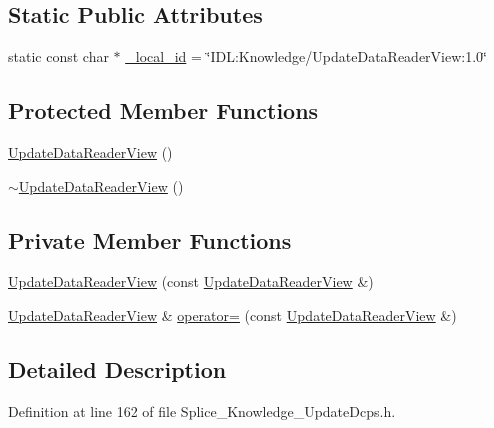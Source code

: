 \subsection*{Static Public Attributes}
\begin{DoxyCompactItemize}
\item 
static const char $\ast$ \hyperlink{classKnowledge_1_1UpdateDataReaderView_a245b395880e8012c3522f482ce57714d}{\_\-local\_\-id} = \char`\"{}IDL:Knowledge/UpdateDataReaderView:1.0\char`\"{}
\end{DoxyCompactItemize}
\subsection*{Protected Member Functions}
\begin{DoxyCompactItemize}
\item 
\hyperlink{classKnowledge_1_1UpdateDataReaderView_afb389ef63212060339e8983c4e6eeead}{UpdateDataReaderView} ()
\item 
\hyperlink{classKnowledge_1_1UpdateDataReaderView_a48f0e0ce757e0cb815d0b7cecd9781d5}{$\sim$UpdateDataReaderView} ()
\end{DoxyCompactItemize}
\subsection*{Private Member Functions}
\begin{DoxyCompactItemize}
\item 
\hyperlink{classKnowledge_1_1UpdateDataReaderView_aac8ebca151e7613f4d11995d9aff111c}{UpdateDataReaderView} (const \hyperlink{classKnowledge_1_1UpdateDataReaderView}{UpdateDataReaderView} \&)
\item 
\hyperlink{classKnowledge_1_1UpdateDataReaderView}{UpdateDataReaderView} \& \hyperlink{classKnowledge_1_1UpdateDataReaderView_a7c14c2de92430c15ef9eb08f580cbcc2}{operator=} (const \hyperlink{classKnowledge_1_1UpdateDataReaderView}{UpdateDataReaderView} \&)
\end{DoxyCompactItemize}


\subsection{Detailed Description}


Definition at line 162 of file Splice\_\-Knowledge\_\-UpdateDcps.h.



